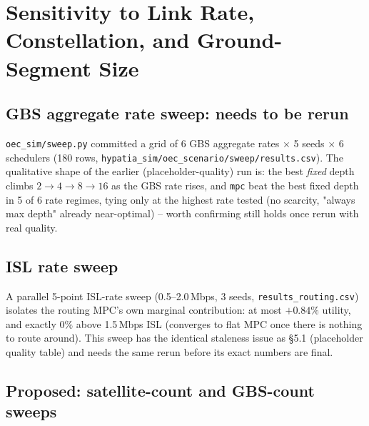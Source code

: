 \section{Sensitivity to Link Rate, Constellation, and Ground-Segment Size}
\label{sec:sweeps}

\subsection{GBS aggregate rate sweep: needs to be rerun}

\texttt{oec\_sim/sweep.py} committed a grid of 6 GBS aggregate rates
$\times$ 5 seeds $\times$ 6 schedulers (180 rows,
\texttt{hypatia\_sim/oec\_scenario/sweep/results.csv}).  The qualitative shape of the earlier
(placeholder-quality) run is: the best \emph{fixed} depth climbs
$2\to4\to8\to16$ as the GBS rate rises, and \texttt{mpc} beat the best fixed
depth in 5 of 6 rate regimes, tying only at the highest rate tested (no
scarcity, "always max depth" already near-optimal) -- worth confirming
still holds once rerun with real quality.

\subsection{ISL rate sweep}

A parallel 5-point ISL-rate sweep (0.5--2.0\,Mbps, 3 seeds,
\texttt{results\_routing.csv}) isolates the routing MPC's own marginal
contribution: at most $+0.84\%$ utility, and exactly $0\%$ above 1.5\,Mbps
ISL (converges to flat MPC once there is nothing to route around). This
sweep has the identical staleness issue as \S5.1 (placeholder quality
table) and needs the same rerun before its exact numbers are final.

\subsection{Proposed: satellite-count and GBS-count sweeps}


